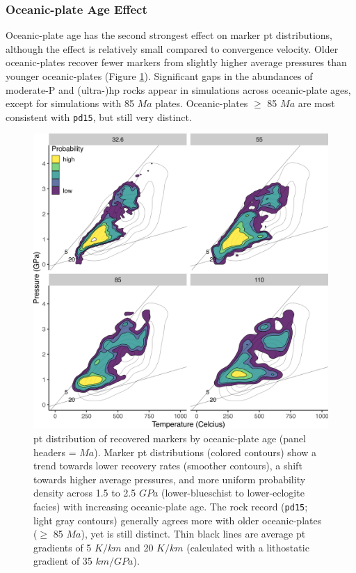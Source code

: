 \hypertarget{oceanic-plate-age-effect}{%
\subsubsection{Oceanic-plate Age Effect}\label{oceanic-plate-age-effect}}

Oceanic-plate age has the second strongest effect on marker \gls{pt} distributions, although the effect is relatively small compared to convergence velocity. Older oceanic-plates recover fewer markers from slightly higher average pressures than younger oceanic-plates (Figure \ref{fig:ageDensity}). Significant gaps in the abundances of moderate-P and (ultra-)\gls{hp} rocks appear in simulations across oceanic-plate ages, except for simulations with 85 \(Ma\) plates. Oceanic-plates \(\geq\) 85 \(Ma\) are most consistent with \texttt{pd15}, but still very distinct.



\begin{figure}[htbp]

{\centering \includegraphics[width=1\linewidth,]{assets/figs/chpt4/ageDensity} 

}

\caption[\gls{pt} distribution of recovered markers by oceanic-plate age]{\gls{pt} distribution of recovered markers by oceanic-plate age (panel headers = \(Ma\)). Marker \gls{pt} distributions (colored contours) show a trend towards lower recovery rates (smoother contours), a shift towards higher average pressures, and more uniform probability density across 1.5 to 2.5 \(GPa\) (lower-blueschist to lower-eclogite facies) with increasing oceanic-plate age. The rock record (\texttt{pd15}; light gray contours) generally agrees more with older oceanic-plates (\(\geq\) 85 \(Ma\)), yet is still distinct. Thin black lines are average \gls{pt} gradients of 5 \(K/km\) and 20 \(K/km\) (calculated with a lithostatic gradient of 35 \(km/GPa\)).}\label{fig:ageDensity}
\end{figure}

